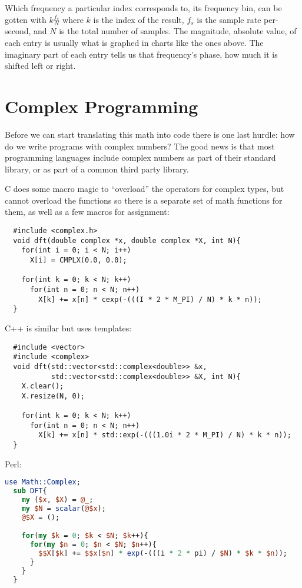 \documentclass[12pt]{article}
\begin{document}
Which frequency a particular index corresponds to, its frequency bin, can be gotten with $k\frac{f_s}{N}$
where $k$ is the index of the result, $f_s$ is the sample rate per-second, and $N$ is the total number of samples. The magnitude, absolute value, of each entry is usually what is graphed in charts like the ones above. The imaginary part of each entry tells us that frequency's phase, how much it is shifted left or right.
\pagebreak

\section{Complex Programming}

Before we can start translating this math into code there is one last hurdle: how do we write programs with complex numbers? The good news is that most programming languages include complex numbers as part of their standard library, or as part of a common third party library.

C does some macro magic to ``overload'' the operators for complex types, but cannot overload the functions so there is a separate set of math functions for them, as well as a few macros for assignment:
\begin{lstlisting}
  #include <complex.h>
  void dft(double complex *x, double complex *X, int N){
    for(int i = 0; i < N; i++)
      X[i] = CMPLX(0.0, 0.0);

    for(int k = 0; k < N; k++)
      for(int n = 0; n < N; n++)
        X[k] += x[n] * cexp(-(((I * 2 * M_PI) / N) * k * n));
  }
\end{lstlisting}

C++ is similar but uses templates:
\begin{lstlisting}
  #include <vector>
  #include <complex>
  void dft(std::vector<std::complex<double>> &x, 
           std::vector<std::complex<double>> &X, int N){
    X.clear();
    X.resize(N, 0);

    for(int k = 0; k < N; k++)
      for(int n = 0; n < N; n++)
        X[k] += x[n] * std::exp(-(((1.0i * 2 * M_PI) / N) * k * n));
  }
\end{lstlisting}

Perl:
\begin{lstlisting}[language=Perl]
  use Math::Complex;
  sub DFT{
    my ($x, $X) = @_;
    my $N = scalar(@$x);
    @$X = ();

    for(my $k = 0; $k < $N; $k++){
      for(my $n = 0; $n < $N; $n++){
        $$X[$k] += $$x[$n] * exp(-(((i * 2 * pi) / $N) * $k * $n));
      }
    }
  }
\end{lstlisting}
\end{document}
